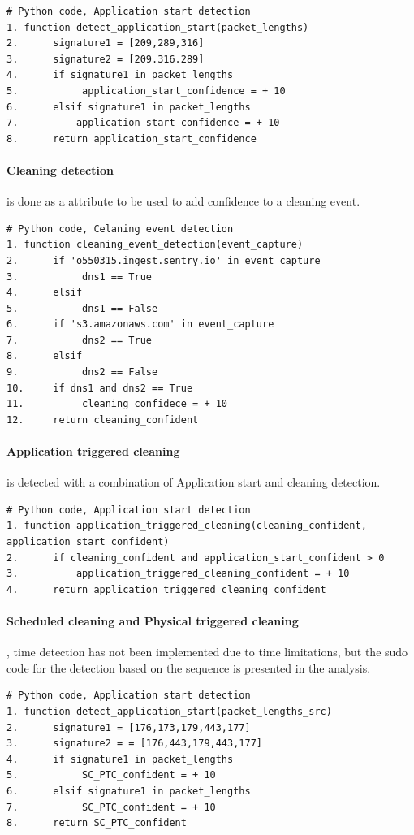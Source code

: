 \begin{lstlisting}
# Python code, Application start detection
1. function detect_application_start(packet_lengths)
2.      signature1 = [209,289,316]
3.      signature2 = [209.316.289]
4.      if signature1 in packet_lengths
5.           application_start_confidence = + 10
6.      elsif signature1 in packet_lengths
7.          application_start_confidence = + 10
8.      return application_start_confidence
\end{lstlisting}

\paragraph{Cleaning detection} is done as a attribute to be used to add confidence to a cleaning event. 
\begin{lstlisting}
# Python code, Celaning event detection
1. function cleaning_event_detection(event_capture)
2.      if 'o550315.ingest.sentry.io' in event_capture
3.           dns1 == True
4.      elsif
5.           dns1 == False
6.      if 's3.amazonaws.com' in event_capture
7.           dns2 == True
8.      elsif
9.           dns2 == False
10.     if dns1 and dns2 == True      
11.          cleaning_confidece = + 10
12.     return cleaning_confident
\end{lstlisting}

\paragraph{Application triggered cleaning} is detected with a combination of Application start and cleaning detection.
\begin{lstlisting}
# Python code, Application start detection
1. function application_triggered_cleaning(cleaning_confident, application_start_confident)
2.      if cleaning_confident and application_start_confident > 0
3.          application_triggered_cleaning_confident = + 10
4.      return application_triggered_cleaning_confident
\end{lstlisting}

\paragraph{Scheduled cleaning and Physical triggered cleaning}, time detection has not been implemented due to time limitations, but the sudo code for the detection based on the sequence is presented in the analysis. 
\begin{lstlisting}
# Python code, Application start detection
1. function detect_application_start(packet_lengths_src)
2.      signature1 = [176,173,179,443,177]
3.      signature2 = = [176,443,179,443,177]
4.      if signature1 in packet_lengths
5.           SC_PTC_confident = + 10
6.      elsif signature1 in packet_lengths
7.           SC_PTC_confident = + 10
8.      return SC_PTC_confident
\end{lstlisting}

